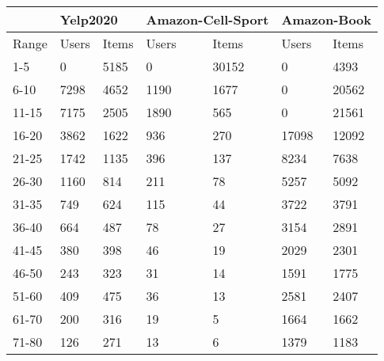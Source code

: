 \begin{table*}[]%
    \begin{tabular}{|l|l|l|l|l|l|l|}
    \hline
            & \multicolumn{2}{l|}{Yelp2020} & \multicolumn{2}{l|}{Amazon-Cell-Sport} & \multicolumn{2}{l|}{Amazon-Book} \\ \hline
    Range   & Users         & Items         & Users              & Items             & Users           & Items          \\ \hline
    1-5     & 0             & 5185          & 0                  & 30152             & 0               & 4393           \\ \hline
    6-10    & 7298          & 4652          & 1190               & 1677              & 0               & 20562          \\ \hline
    11-15   & 7175          & 2505          & 1890               & 565               & 0               & 21561          \\ \hline
    16-20   & 3862          & 1622          & 936                & 270               & 17098           & 12092          \\ \hline
    21-25   & 1742          & 1135          & 396                & 137               & 8234            & 7638           \\ \hline
    26-30   & 1160          & 814           & 211                & 78                & 5257            & 5092           \\ \hline
    31-35   & 749           & 624           & 115                & 44                & 3722            & 3791           \\ \hline
    36-40   & 664           & 487           & 78                 & 27                & 3154            & 2891           \\ \hline
    41-45   & 380           & 398           & 46                 & 19                & 2029            & 2301           \\ \hline
    46-50   & 243           & 323           & 31                 & 14                & 1591            & 1775           \\ \hline
    51-60   & 409           & 475           & 36                 & 13                & 2581            & 2407           \\ \hline
    61-70   & 200           & 316           & 19                 & 5                 & 1664            & 1662           \\ \hline
    71-80   & 126           & 271           & 13                 & 6                 & 1379            & 1183           \\ \hline

\end{tabular}
\end{table*}
